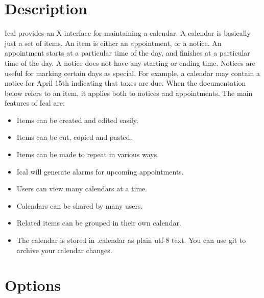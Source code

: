 \documentclass[a4paper,english]{article}
\begin{document}
\section{Description}

    \begin{Description}\setlength{\itemsep}{0cm}

    Ical provides an X interface for maintaining a calendar.  A
    calendar is basically just a set of items. An item is either an
    appointment, or a notice. An appointment starts at a particular time
    of the day, and finishes at a particular time of the day. A notice
    does not have any starting or ending time.  Notices are useful for
    marking certain days as special. For example, a calendar may contain
    a notice for April 15th indicating that taxes are due.  When the
    documentation below refers to an item, it applies both to notices
    and appointments.  The main features of Ical are:

    \begin{itemize}
        \item Items can be created and edited easily.
        \item Items can be cut, copied and pasted.
        \item Items can be made to repeat in various ways.
        \item Ical will generate alarms for upcoming appointments.
        \item Users can view many calendars at a time.
        \item Calendars can be shared by many users.
        \item Related items can be grouped in their own calendar.
        \item The calendar is stored in .calendar as plain utf-8
        text. You can use git to archive your calendar changes.
    \end{itemize}
    \end{Description}

\section{Options}
\end{document}
